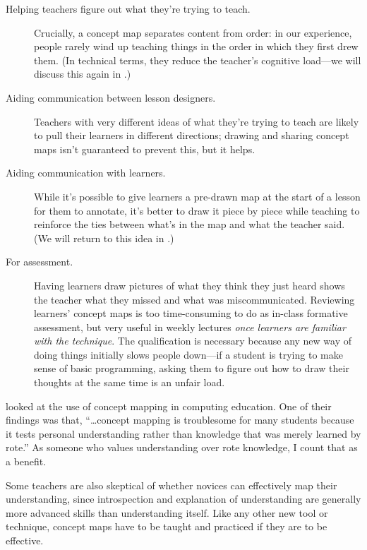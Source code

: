 \begin{description}

\item[Helping teachers figure out what they're trying to teach.]
  Crucially, a concept map separates content from order: in our
  experience, people rarely wind up teaching things in the order in
  which they first drew them.  (In technical terms, they reduce the
  teacher's cognitive load---we will discuss this again in
  .)

\item[Aiding communication between lesson designers.] Teachers with
  very different ideas of what they're trying to teach are likely to
  pull their learners in different directions; drawing and sharing
  concept maps isn't guaranteed to prevent this, but it helps.

\item[Aiding communication with learners.] While it's possible to give
  learners a pre-drawn map at the start of a lesson for them to
  annotate, it's better to draw it piece by piece while teaching to
  reinforce the ties between what's in the map and what the teacher
  said. (We will return to this idea in
  .)

\item[For assessment.]  Having learners draw pictures of what they
  think they just heard shows the teacher what they missed and what
  was miscommunicated.  Reviewing learners' concept maps is too
  time-consuming to do as in-class formative assessment, but very
  useful in weekly lectures \emph{once learners are familiar with the
    technique}. The qualification is necessary because any new way of
  doing things initially slows people down---if a student is trying to
  make sense of basic programming, asking them to figure out how to
  draw their thoughts at the same time is an unfair load.

\end{description}

\cite{Kepp2008} looked at the use of concept mapping in computing
education.  One of their findings was that, ``{\ldots}concept mapping
is troublesome for many students because it tests personal
understanding rather than knowledge that was merely learned by rote.''
As someone who values understanding over rote knowledge, I count that
as a benefit.

Some teachers are also skeptical of whether novices can effectively
map their understanding, since introspection and explanation of
understanding are generally more advanced skills than understanding
itself.  Like any other new tool or technique, concept maps have to be
taught and practiced if they are to be effective.

